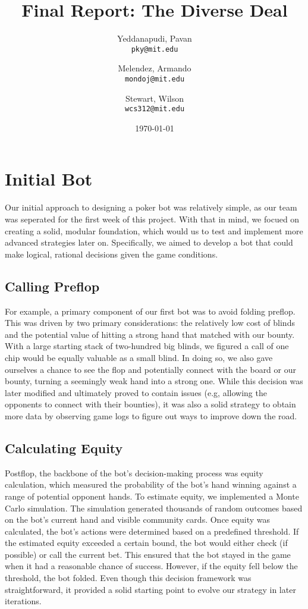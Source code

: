\documentclass{article}
\title{Final Report: The Diverse Deal}
\date{\today}
\author{
  Yeddanapudi, Pavan\\
  \texttt{pky@mit.edu}
  \and
  Melendez, Armando\\
  \texttt{mondoj@mit.edu}
  \and
  Stewart, Wilson\\
  \texttt{wcs312@mit.edu}
}
\begin{document}
    \maketitle

    \section*{Initial Bot}
    
    Our initial approach to designing a poker bot was relatively simple, as our team was seperated for the first week of this project. With that in mind, we focued on creating a solid, modular foundation, which would us to test and implement more advanced strategies later on. Specifically, we aimed to develop a bot that could make logical, rational decisions given the game conditions. 
    \subsection*{Calling Preflop}
    
    For example, a primary component of our first bot was to avoid folding preflop. This was driven by two primary considerations: the relatively low cost of blinds and the potential value of hitting a strong hand that matched with our bounty. With a large starting stack of two-hundred big blinds, we figured a call of one chip would be equally valuable as a small blind. In doing so, we also gave ourselves a chance to see the flop and potentially connect with the board or our bounty, turning a seemingly weak hand into a strong one. While this decision was later modified and ultimately proved to contain issues (e.g, allowing the opponents to connect with their bounties), it was also a solid strategy to obtain more data by observing game logs to figure out ways to improve down the road.
    
    \subsection*{Calculating Equity}
    Postflop, the backbone of the bot’s decision-making process was equity calculation, which measured the probability of the bot’s hand winning against a range of potential opponent hands. To estimate equity, we implemented a Monte Carlo simulation. The simulation generated thousands of random outcomes based on the bot’s current hand and visible community cards. 
    Once equity was calculated, the bot’s actions were determined based on a predefined threshold. If the estimated equity exceeded a certain bound, the bot would either check (if possible) or call the current bet. This ensured that the bot stayed in the game when it had a reasonable chance of success. However, if the equity fell below the threshold, the bot folded. Even though this decision framework was straightforward, it provided a solid starting point to evolve our strategy in later iterations.
\end{document}
